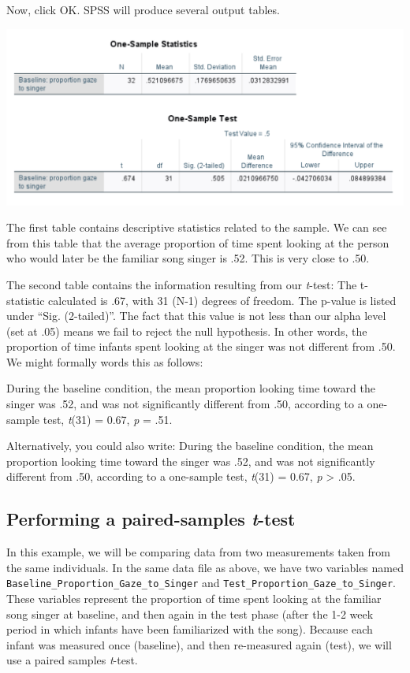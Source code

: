 \documentclass[
]{book}
\begin{document}
Now, click {OK}. SPSS will produce several output tables.

\includegraphics{img/6.4.16.png}

The first table contains descriptive statistics related to the sample. We can see from this table that the average proportion of time spent looking at the person who would later be the familiar song singer is .52. This is very close to .50.

The second table contains the information resulting from our \emph{t}-test: The t-statistic calculated is .67, with 31 (N-1) degrees of freedom. The p-value is listed under ``Sig. (2-tailed)''. The fact that this value is not less than our alpha level (set at .05) means we fail to reject the null hypothesis. In other words, the proportion of time infants spent looking at the singer was not different from .50. We might formally words this as follows:

During the baseline condition, the mean proportion looking time toward the singer was .52, and was not significantly different from .50, according to a one-sample test, \emph{t}(31) = 0.67, \emph{p} = .51.

Alternatively, you could also write:
During the baseline condition, the mean proportion looking time toward the singer was .52, and was not significantly different from .50, according to a one-sample test, \emph{t}(31) = 0.67, \emph{p} \textgreater{} .05.

\hypertarget{performing-a-paired-samples-t-test}{%
\subsection{\texorpdfstring{Performing a paired-samples \emph{t}-test}{Performing a paired-samples t-test}}\label{performing-a-paired-samples-t-test}}

In this example, we will be comparing data from two measurements taken from the same individuals. In the same data file as above, we have two variables named \texttt{Baseline\_Proportion\_Gaze\_to\_Singer} and \texttt{Test\_Proportion\_Gaze\_to\_Singer}. These variables represent the proportion of time spent looking at the familiar song singer at baseline, and then again in the test phase (after the 1-2 week period in which infants have been familiarized with the song). Because each infant was measured once (baseline), and then re-measured again (test), we will use a paired samples \emph{t}-test.
\end{document}
